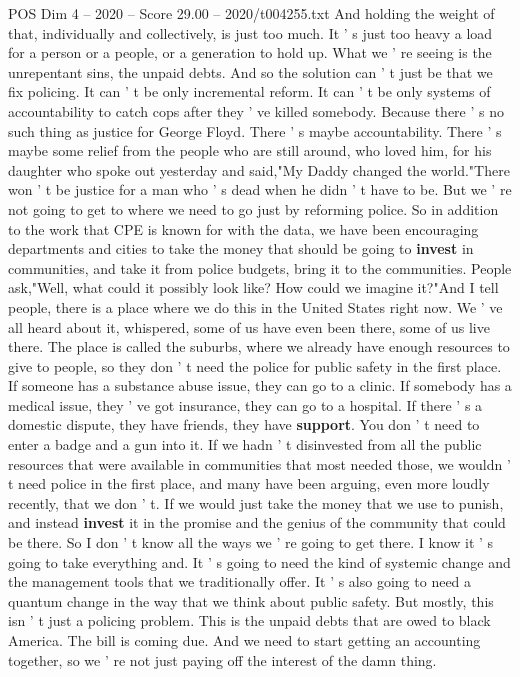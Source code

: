 \begin{textsample}{POS Dim 4 – 2020 – Score 29.00 – 2020/t004255.txt}
And holding the weight of that, individually and collectively, is just too much.
It ' s just too heavy a load for a person or a people, or a generation to hold up.
What we ' re seeing is the unrepentant sins, the unpaid debts.
And so the solution can ' t just be that we fix policing.
It can ' t be only incremental reform.
It can ' t be only systems of accountability to catch cops after they ' ve killed somebody.
Because there ' s no such thing as justice for George Floyd.
There ' s maybe accountability.
There ' s maybe some relief from the people who are still around, who loved him, for his daughter who spoke out yesterday and said,"My Daddy changed the world."There won ' t be justice for a man who ' s dead when he didn ' t have to be.
But we ' re not going to get to where we need to go just by reforming police.
So in addition to the work that CPE is known for with the data, we have been encouraging departments and cities to take the money that should be going to \textbf{invest} in communities, and take it from police budgets, bring it to the communities.
People ask,"Well, what could it possibly look like?
How could we imagine it?"And I tell people, there is a place where we do this in the United States right now.
We ' ve all heard about it, whispered, some of us have even been there, some of us live there.
The place is called the suburbs, where we already have enough resources to give to people, so they don ' t need the police for public safety in the first place.
If someone has a substance abuse issue, they can go to a clinic.
If somebody has a medical issue, they ' ve got insurance, they can go to a hospital.
If there ' s a domestic dispute, they have friends, they have \textbf{support}.
You don ' t need to enter a badge and a gun into it.
If we hadn ' t disinvested from all the public resources that were available in communities that most needed those, we wouldn ' t need police in the first place, and many have been arguing, even more loudly recently, that we don ' t.
If we would just take the money that we use to punish, and instead \textbf{invest} it in the promise and the genius of the community that could be there.
So I don ' t know all the ways we ' re going to get there.
I know it ' s going to take everything and.
It ' s going to need the kind of systemic change and the management tools that we traditionally offer.
It ' s also going to need a quantum change in the way that we think about public safety.
But mostly, this isn ' t just a policing problem.
This is the unpaid debts that are owed to black America.
The bill is coming due.
And we need to start getting an accounting together, so we ' re not just paying off the interest of the damn thing.

\end{textsample}
